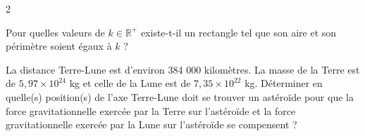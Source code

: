 \documentclass[a4paper,12pt]{article}
\begin{document}
\begin{multicols}{2}
\begin{exercice}[title=Exercice 31 \quad$\star\star\star$\quad\ {[Calculer, Chercher, Représenter]}]{}{}
Pour quelles valeurs de \( k \in \mathbb{R}^+ \) existe-t-il un rectangle tel que son aire et son périmètre soient égaux à \( k \) ?
\end{exercice}

\begin{exercice}[title=Exercice 32 \quad$\star\star\star$\quad\ {[Modéliser, Chercher, Calculer]}]{}{}
La distance Terre-Lune est d’environ 384 000 kilomètres. La masse de la Terre est de \(5,97 \times 10^{24}\) kg et celle de la Lune est de \(7,35 \times 10^{22}\) kg. Déterminer en quelle(s) position(s) de l’axe Terre-Lune doit se trouver un astéroïde pour que la force gravitationnelle exercée par la Terre sur l’astéroïde et la force gravitationnelle exercée par la Lune sur l’astéroïde se compensent ?
\end{exercice}

\end{multicols}
\end{document}
